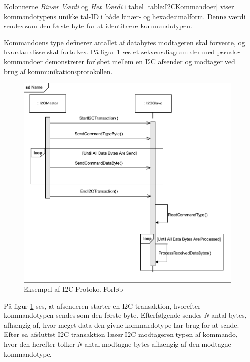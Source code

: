 \noindent Kolonnerne \textit{Binær Værdi} og \textit{Hex Værdi} i tabel \ref{table:I2CKommandoer} viser kommandotypens unikke tal-ID i både binær- og hexadecimalform. Denne værdi sendes som den første byte for at identificere kommandotypen.\newline

\noindent Kommandoens type definerer antallet af databytes modtageren skal forvente, og hvordan disse skal fortolkes. På figur \ref{fig:I2CProtokolEksempel} ses et sekvensdiagram der med pseudo-kommandoer demonstrerer forløbet mellem en I2C afsender og modtager ved brug af kommunikationsprotokollen.

\begin{figure}[H]
	\centering
	\includegraphics[width=\textwidth] {Systemarkitektur/images/I2CProtocol.pdf}
	\caption{Eksempel af I2C Protokol Forløb}
	\label{fig:I2CProtokolEksempel}
\end{figure}

\noindent På figur \ref{fig:I2CProtokolEksempel} ses, at afsenderen starter en I2C transaktion, hvorefter kommandotypen sendes som den første byte. Efterfølgende sendes \textit{N} antal bytes, afhængig af, hvor meget data den givne kommandotype har brug for at sende. Efter en afsluttet I2C transaktion læser I2C modtageren typen af kommando, hvor den herefter tolker \textit{N} antal modtagne bytes afhængig af den modtagne kommandotype.

